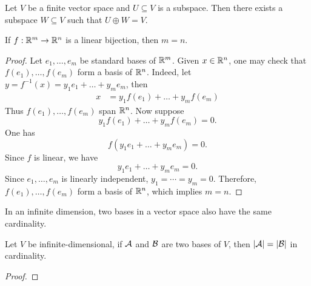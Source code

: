 \begin{theorem}
  
\end{theorem}
\begin{corollary}
  Let $V$ be a finite vector space and $U \subseteq V$ is a subspace. Then there exists a subspace $W \subseteq V$ such that $U \oplus W = V$.
\end{corollary}
\begin{proposition}
  If $f: \mathbb{R}^m \to \mathbb{R}^n$ is a linear bijection, then $m = n$.
\end{proposition}
\begin{proof}
  Let $e_1,\dots, e_m$ be standard bases of $\mathbb{R}^m$. Given $x \in \mathbb{R}^n$, one may check that $f(e_1),\dots, f(e_m)$ form a basis of $\mathbb{R}^n$. Indeed, let $y = f^{-1}(x) = y_1e_1 + \dots +y_m e_m$, then
  \begin{align*}
    x &= y_1 f(e_1) + \dots + y_m f(e_m)
  \end{align*}
  Thus $f(e_1),\dots, f(e_m)$ span $\mathbb{R}^n$. Now suppose 
  \[
    y_1 f(e_1) + \dots + y_mf(e_m) = 0.
  \]
  One has 
  \[
    f(y_1e_1 + \dots + y_me_m) = 0.
  \]
  Since $f$ is linear, we have 
  \[
    y_1e_1 + \dots +y_m e_m  = 0.
  \]
  Since $e_1,\dots, e_m$ is linearly independent, $y_1 = \cdots = y_m = 0$. Therefore, $f(e_1),\dots, f(e_m)$ form a basis of $\mathbb{R}^n$, which implies $m = n$.
\end{proof}
In an infinite dimension, two bases in a vector space also have the same cardinality.
\begin{proposition}
  Let $V$ be infinite-dimensional, if $\mathcal{A}$ and $\mathcal{B}$ are two bases of $V$, then $|\mathcal{A}| = |\mathcal{B}|$ in cardinality.
\end{proposition}
\begin{proof}
  
\end{proof}